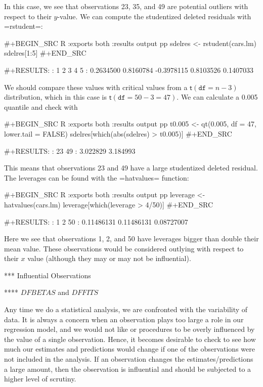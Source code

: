 In this case, we see that observations 23, 35, and 49 are potential
outliers with respect to their \(y\)-value.  We can compute the
studentized deleted residuals with =rstudent=:

#+BEGIN_SRC R :exports both :results output pp 
sdelres <- rstudent(cars.lm)
sdelres[1:5]
#+END_SRC

#+RESULTS:
:          1          2          3          4          5 
:  0.2634500  0.8160784 -0.3978115  0.8103526  0.1407033

We should compare these values with critical values from a
\(\mathsf{t}(\mathtt{df}=n-3)\) distribution, which in this case is
\(\mathsf{t}(\mathtt{df}=50-3=47)\). We can calculate a 0.005 quantile
and check with

#+BEGIN_SRC R :exports both :results output pp 
t0.005 <- qt(0.005, df = 47, lower.tail = FALSE)
sdelres[which(abs(sdelres) > t0.005)]
#+END_SRC

#+RESULTS:
:       23       49 
: 3.022829 3.184993

This means that observations 23 and 49 have a large studentized
deleted residual. The leverages can be found with the =hatvalues=
function:

#+BEGIN_SRC R :exports both :results output pp 
leverage <- hatvalues(cars.lm)
leverage[which(leverage > 4/50)]
#+END_SRC

#+RESULTS:
:          1          2         50 
: 0.11486131 0.11486131 0.08727007

Here we see that observations 1, 2, and 50 have leverages bigger than
double their mean value. These observations would be considered
outlying with respect to their \(x\) value (although they may or may
not be influential).

*** Influential Observations

**** \(DFBETAS\) and \(DFFITS\)

Any time we do a statistical analysis, we are confronted with the
variability of data. It is always a concern when an observation plays
too large a role in our regression model, and we would not like or
procedures to be overly influenced by the value of a single
observation. Hence, it becomes desirable to check to see how much our
estimates and predictions would change if one of the observations were
not included in the analysis. If an observation changes the
estimates/predictions a large amount, then the observation is
influential and should be subjected to a higher level of scrutiny.

